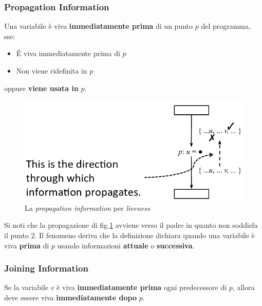 \subsubsection{Propagation Information}
Una variabile \`e viva \textbf{immediatamente prima} di un punto $p$ del
programma, sse:
\begin{itemize}
\item \'E viva immediatamente prima di $p$
\item Non viene ridefinita in $p$
\end{itemize}

oppure \textbf{viene usata in} $p$.

\begin{figure}[H]
  \centering
  \includegraphics[scale=0.4]{res/image/propagation_liveness}
  \caption{La \textit{propagation information} per \textit{liveness}}
  \label{img:propagation_liveness}
\end{figure}

Si noti che la propagazione di fig.\ref{img:propagation_liveness} avviene verso
il padre in quanto non soddisfa il punto 2. Il fenomeno deriva che la
definizione dichiara quando una variabile \`e viva \textbf{prima} di $p$ usando
informazioni \textbf{attuale} o \textbf{successiva}.

\subsubsection{Joining Information}
Se la variabile $v$ \`e viva \textbf{immediatamente prima} ogni predecessore di
$p$, allora deve essere viva \textbf{immediatamente dopo} $p$.

